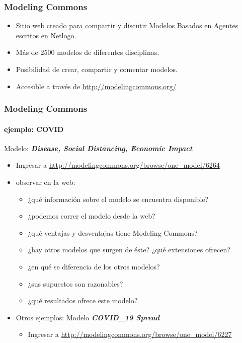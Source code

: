 \documentclass[11pt]{beamer}
\begin{document}
\begin{frame}
\frametitle{Modeling Commons}
\begin{itemize}
	\item Sitio web creado para compartir y discutir Modelos Basados en Agentes escritos en Netlogo.
	\item Más de 2500 modelos de diferentes disciplinas.
	\item Posibilidad de crear, compartir y comentar modelos.
	\item Accesible a través de \url{http://modelingcommons.org/}
\end{itemize}
\end{frame}


\begin{frame}
	\frametitle{Modeling Commons}
	\framesubtitle{ejemplo: COVID}
Modelo: \textit{\textbf{Disease, Social Distancing, Economic Impact }}
	\begin{itemize}
		\item Ingresar a \url{http://modelingcommons.org/browse/one_model/6264}
		\item observar en la web:
		\begin{itemize}
			\item ¿qué información sobre el modelo se encuentra disponible?
			\item ¿podemos correr el modelo desde la web?
			\item ¿qué ventajas y desventajas tiene Modeling Commons?
			\item ¿hay otros modelos que surgen de éste? ¿qué extensiones ofrecen?		
\item ¿en qué se diferencia de los otros modelos?
\item ¿sus supuestos son razonables?
\item ¿qué resultados ofrece este modelo?
		\end{itemize}
		\item Otros ejemplos: Modelo \textit{\textbf{COVID\_19 Spread}}
		\begin{itemize}
		\item Ingresar a \url{http://modelingcommons.org/browse/one_model/6227}
		\end{itemize}
	\end{itemize}
\end{frame}
\end{document}
